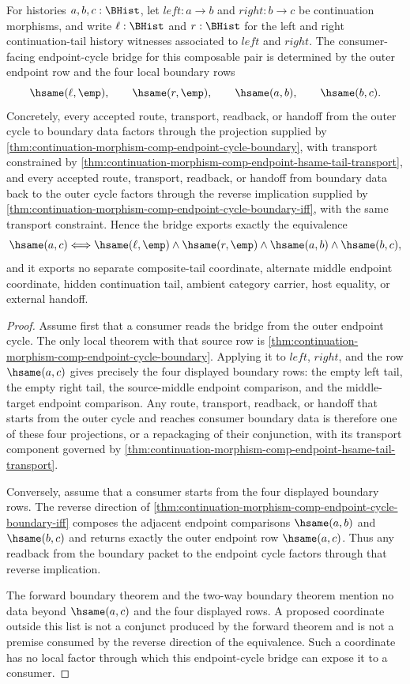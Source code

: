 \begin{lemma}
\label{lem:continuation-morphism-endpoint-cycle-bridge-determinacy}
For histories $a,b,c:\BHist$, let $left:a\to b$ and $right:b\to c$ be
continuation morphisms, and write $\ell:\BHist$ and $r:\BHist$ for the left
and right continuation-tail history witnesses associated to $left$ and $right$.
The consumer-facing endpoint-cycle bridge for this composable pair is determined
by the outer endpoint row and the four local boundary rows
$$
\hsame(\ell,\emp),\qquad
\hsame(r,\emp),\qquad
\hsame(a,b),\qquad
\hsame(b,c).
$$
Concretely, every accepted route, transport, readback, or handoff from the
outer cycle to boundary data factors through the projection supplied by
\autoref{thm:continuation-morphism-comp-endpoint-cycle-boundary}, with transport
constrained by \autoref{thm:continuation-morphism-comp-endpoint-hsame-tail-transport},
and every accepted route, transport, readback, or handoff from boundary data
back to the outer cycle factors through the reverse implication supplied by
\autoref{thm:continuation-morphism-comp-endpoint-cycle-boundary-iff}, with the
same transport constraint. Hence the bridge exports exactly the equivalence
$$
\hsame(a,c)\Longleftrightarrow
\hsame(\ell,\emp)\land
\hsame(r,\emp)\land
\hsame(a,b)\land
\hsame(b,c),
$$
and it exports no separate composite-tail coordinate, alternate middle endpoint
coordinate, hidden continuation tail, ambient category carrier, host equality,
or external handoff.
\end{lemma}
\begin{proof}
Assume first that a consumer reads the bridge from the outer endpoint cycle.
The only local theorem with that source row is
\autoref{thm:continuation-morphism-comp-endpoint-cycle-boundary}. Applying it
to $left$, $right$, and the row $\hsame(a,c)$ gives precisely the four displayed
boundary rows: the empty left tail, the empty right tail, the source-middle
endpoint comparison, and the middle-target endpoint comparison. Any route,
transport, readback, or handoff that starts from the outer cycle and reaches
consumer boundary data is therefore one of these four projections, or a
repackaging of their conjunction, with its transport component governed by
\autoref{thm:continuation-morphism-comp-endpoint-hsame-tail-transport}.

Conversely, assume that a consumer starts from the four displayed boundary
rows. The reverse direction of
\autoref{thm:continuation-morphism-comp-endpoint-cycle-boundary-iff} composes
the adjacent endpoint comparisons $\hsame(a,b)$ and $\hsame(b,c)$ and returns
exactly the outer endpoint row $\hsame(a,c)$. Thus any readback from the
boundary packet to the endpoint cycle factors through that reverse implication.

The forward boundary theorem and the two-way boundary theorem mention no data
beyond $\hsame(a,c)$ and the four displayed rows. A proposed coordinate outside
this list is not a conjunct produced by the forward theorem and is not a premise
consumed by the reverse direction of the equivalence. Such a coordinate has no
local factor through which this endpoint-cycle bridge can expose it to a
consumer.
\end{proof}

